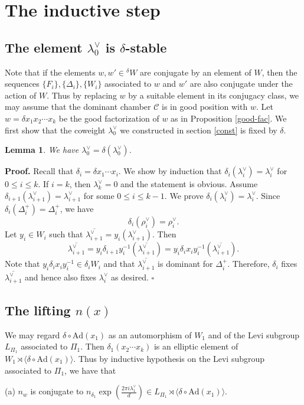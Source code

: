 \documentclass[12pt,leqno]{article}
\newtheorem{lemma}[equation]{Lemma}
\newcommand{\qed}{\hfill $\square$ \medskip}
\newenvironment{proof}[1][Proof]{\noindent\textbf{#1.} }{\qed}
\newcommand{\Ad}{\text{Ad}}
\newcommand{\caC}{\mathcal C}
\renewcommand{\sec}[1]{\section{#1}
\renewcommand{\theequation}{\thesection.\arabic{equation}}
  \setcounter{equation}{0}}
\def\le{\leqslant}
\def\d{\delta}
\def\D{\Delta}
\def\l{\lambda}
\renewcommand{\sec}[1]{\section{#1}
\renewcommand{\theequation}{\thesection.\arabic{equation}}
  \setcounter{equation}{0}}
\begin{document}
\sec{The inductive step}

\subsection{The element $\l_0^\vee$ is $\d$-stable} Note that if the elements $w, w' \in {}^\d W$ are conjugate by an element of $W$, then the sequences $\{F_i\}, \{\D_i\}, \{W_i\}$ associated to $w$ and $w'$ are also conjugate under the action of $W$. Thus by replacing $w$ by a suitable element in its conjugacy class, we may assume that the dominant chamber $\caC$ is in good position with $w$. Let $w=\d x_1 x_2 \cdots x_k$ be the good factorization of $w$ as in Proposition \ref{good-fac}. We first show that the coweight $\l_0^\vee$ we constructed in section \ref{const} is fixed by $\d$.

\begin{lemma} \label{dom}
	We have $\l_0^\vee = \d(\l_0^\vee)$.
\end{lemma}
\begin{proof}
    Recall that $\d_i=\d x_1 \cdots x_{i}$. We show by induction that $\d_{i}(\l^\vee_{i})=\l^\vee_{i}$ for $0 \le i \le k$. If $i=k$, then $\l_k^\vee = 0$ and the statement is obvious. Assume $\d_{i+1}(\l_{i+1}^\vee) = \l_{i+1}^\vee$ for some $0 \le i \le k-1$. We prove $\d_i(\l_i^\vee)=\l_i^\vee$. Since $\d_{i}(\D_i^+)=\D_i^+$, we have $$\d_{i}(\rho_i^\vee)=\rho_i^\vee.$$ Let $y_i \in W_i$ such that $\overline{\l_{i+1}^\vee} = y_i(\l_{i+1}^\vee)$. Then $$\overline{\l_{i+1}^\vee}=y_i \d_{i+1} y_i^{-1} (\overline{\l_{i+1}^\vee}) =y_i \d_i x_i y_i^{-1} (\overline{\l_{i+1}^\vee}).$$ Note that $y_i \d_i x_i y_i^{-1} \in \d_i W_i$ and that $\overline{\l_{i+1}^\vee}$ is dominant for $\D_i^+$. Therefore, $\d_i$ fixes $\overline{\l_{i+1}^\vee}$ and hence also fixes $\l_i^\vee$ as desired.
\end{proof}

\subsection{The lifting $n(x)$}\label{setup}

We may regard $\d \circ \Ad(x_1)$ as an automorphism of $W_1$ and of the Levi subgroup $L_{\Pi_1}$ associated to $\Pi_1$. Then $\d_1 (x_2 \cdots x_k)$ is an elliptic element of $W_1 \rtimes \langle\d \circ \Ad(x_1)\rangle$. Thus by inductive hypothesis on the Levi subgroup associated to $\Pi_1$, we have that

(a) $n_w$ is conjugate to $n_{\d_1} \exp(\frac{2 \pi i \l^\vee_1}{d}) \in L_{\Pi_1} \rtimes \langle\d \circ \Ad(x_1)\rangle$.
\end{document}
